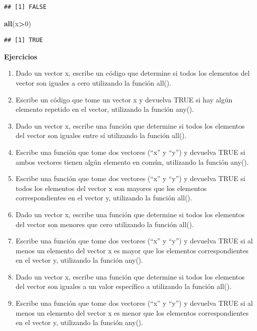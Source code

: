 \documentclass[
]{book}
\newenvironment{Shaded}{\begin{snugshade}}{\end{snugshade}}
\newcommand{\DecValTok}[1]{\textcolor[rgb]{0.00,0.00,0.81}{#1}}
\newcommand{\FunctionTok}[1]{\textcolor[rgb]{0.13,0.29,0.53}{\textbf{#1}}}
\newcommand{\NormalTok}[1]{#1}
\newcommand{\SpecialCharTok}[1]{\textcolor[rgb]{0.81,0.36,0.00}{\textbf{#1}}}
\providecommand{\tightlist}{%
  \setlength{\itemsep}{0pt}\setlength{\parskip}{0pt}}
\begin{document}
\begin{verbatim}
## [1] FALSE
\end{verbatim}

\begin{Shaded}
\begin{Highlighting}[]
\FunctionTok{all}\NormalTok{(x}\SpecialCharTok{\textgreater{}}\DecValTok{0}\NormalTok{)}
\end{Highlighting}
\end{Shaded}

\begin{verbatim}
## [1] TRUE
\end{verbatim}

\textbf{Ejercicios}

\begin{enumerate}
\def\labelenumi{\arabic{enumi}.}
\tightlist
\item
  Dado un vector x, escribe un código que determine si todos los elementos del vector son iguales a cero utilizando la función all().
\item
  Escribe un código que tome un vector x y devuelva TRUE si hay algún elemento repetido en el vector, utilizando la función any().
\item
  Dado un vector x, escribe una función que determine si todos los elementos del vector son iguales entre sí utilizando la función all().
\item
  Escribe una función que tome dos vectores (``x'' y ``y'') y devuelva TRUE si ambos vectores tienen algún elemento en común, utilizando la función any().
\item
  Escribe una función que tome dos vectores (``x'' y ``y'') y devuelva TRUE si todos los elementos del vector x son mayores que los elementos correspondientes en el vector y, utilizando la función all().
\item
  Dado un vector x, escribe una función que determine si todos los elementos del vector son menores que cero utilizando la función all().
\item
  Escribe una función que tome dos vectores (``x'' y ``y'') y devuelva TRUE si al menos un elemento del vector x es mayor que los elementos correspondientes en el vector y, utilizando la función any().
\item
  Dado un vector x, escribe una función que determine si todos los elementos del vector son iguales a un valor específico a utilizando la función all().
\item
  Escribe una función que tome dos vectores (``x'' y ``y'') y devuelva TRUE si al menos un elemento del vector x es menor que los elementos correspondientes en el vector y, utilizando la función any().
\end{enumerate}
\end{document}
